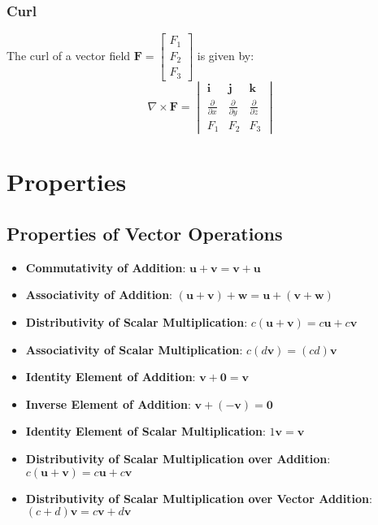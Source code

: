 \documentclass{article}
\begin{document}
\subsubsection*{Curl}
The curl of a vector field \(\mathbf{F} = \begin{bmatrix} F_1 \\ F_2 \\ F_3 \end{bmatrix}\) is given by:
\[
\nabla \times \mathbf{F} = \begin{vmatrix}
\mathbf{i} & \mathbf{j} & \mathbf{k} \\
\frac{\partial}{\partial x} & \frac{\partial}{\partial y} & \frac{\partial}{\partial z} \\
F_1 & F_2 & F_3
\end{vmatrix}
\]
\section*{Properties}
\subsection*{Properties of Vector Operations}
\begin{itemize}
    \item \textbf{Commutativity of Addition}:
    \(\mathbf{u} + \mathbf{v} = \mathbf{v} + \mathbf{u}\)

    \item \textbf{Associativity of Addition}:
    \((\mathbf{u} + \mathbf{v}) + \mathbf{w} = \mathbf{u} + (\mathbf{v} + \mathbf{w})\)

    \item \textbf{Distributivity of Scalar Multiplication}:
    \(c (\mathbf{u} + \mathbf{v}) = c \mathbf{u} + c \mathbf{v}\)

    \item \textbf{Associativity of Scalar Multiplication}:
    \(c (d \mathbf{v}) = (cd) \mathbf{v}\)

    \item \textbf{Identity Element of Addition}:
    \(\mathbf{v} + \mathbf{0} = \mathbf{v}\)

    \item \textbf{Inverse Element of Addition}:
    \(\mathbf{v} + (-\mathbf{v}) = \mathbf{0}\)

    \item \textbf{Identity Element of Scalar Multiplication}:
    \(1 \mathbf{v} = \mathbf{v}\)

    \item \textbf{Distributivity of Scalar Multiplication over Addition}:
    \(c (\mathbf{u} + \mathbf{v}) = c \mathbf{u} + c \mathbf{v}\)

    \item \textbf{Distributivity of Scalar Multiplication over Vector Addition}:
    \((c + d) \mathbf{v} = c \mathbf{v} + d \mathbf{v}\)
\end{itemize}
\end{document}
